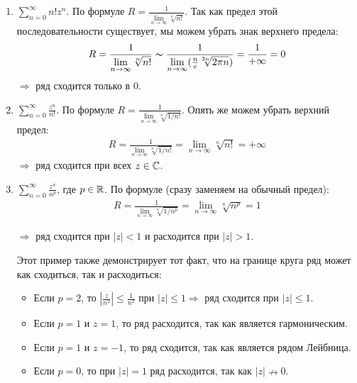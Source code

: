 \begin{examples}
    \begin{enumerate}
        \item $\sum\limits_{n=0}^\infty n!z^n$. 
        По формуле $R = \frac{1}{\overline{\lim\limits_{n \to \infty}} \sqrt[n]{n!}}$. 
        Так как предел этой последовательности существует, мы можем убрать знак верхнего предела: 
        \begin{gather*}
            R = \frac{1}{\lim\limits_{n \to \infty} \sqrt[n]{n!}} \thicksim \frac{1}{\lim\limits_{n \to \infty} (\frac{n}{e}\sqrt[2n]{2\pi n})} = \frac{1}{+\infty} = 0
        \end{gather*}
        $\Longrightarrow$ ряд сходится только в 0.
        \item $\sum\limits_{n=0}^\infty \frac{z^n}{n!}$. 
        По формуле $R = \frac{1}{\overline{\lim\limits_{n \to \infty}} \sqrt[n]{1/n!}}$.
        Опять же можем убрать верхний предел: 
        \begin{gather*}
            R = \frac{1}{\lim\limits_{n \to \infty} \sqrt[n]{1/n!}} = \lim\limits_{n \to \infty} \sqrt[n]{n!} = +\infty
        \end{gather*}
        $\Longrightarrow$ ряд сходится при всех $z \in \mathbb{C}$.
        \item $\sum\limits_{n=0}^\infty \frac{z^n}{n^p}$, где $p \in \mathbb{R}$.
        По формуле (сразу заменяем на обычный предел): 
        \begin{gather*} 
            R = \frac{1}{\lim\limits_{n \to \infty} \sqrt[n]{1/n^p}} = \lim\limits_{n \to \infty} \sqrt[n]{n^p} = 1
        \end{gather*}
        
        $\Longrightarrow$ ряд сходится при $|z| < 1$ и расходится при $|z| > 1$.

        Этот пример также демонстрирует тот факт, что на границе круга ряд может как сходиться, так и расходиться: \begin{itemize}
            \item Если $p = 2$, то $|\frac{z}{n^2}| \leqslant \frac{1}{n^2}$ при $|z| \leqslant 1 \Rightarrow$ ряд сходится при $|z| \leqslant 1$.
            \item Если $p = 1$ и $z = 1$, то ряд расходится, так как является гармоническим.
            \item Если $p = 1$ и $z = -1$, то ряд сходится, так как является рядом Лейбница.
            \item Если $p = 0$, то при $|z| = 1$ ряд расходится, так как $|z| \nrightarrow 0$.
        \end{itemize}
    \end{enumerate}    
\end{examples}

